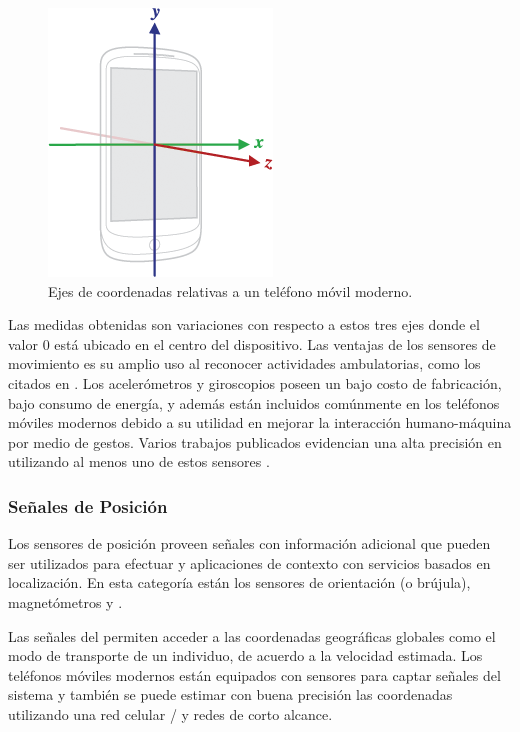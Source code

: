 \begin{figure}[!tbph]
\begin{centering}
\includegraphics[scale=0.7]{capitulo-4/graphics/axis_device}
\par\end{centering}
\caption[Sistemas de coordenadas relativo a dispositivo]{\label{fig4:axis-phone}Ejes de coordenadas relativas a un teléfono
móvil moderno.}

\end{figure}

Las medidas obtenidas son variaciones con respecto a estos tres ejes
donde el valor $0$ está ubicado en el centro del dispositivo. Las
ventajas de los sensores de movimiento es su amplio uso al reconocer
actividades ambulatorias, como los citados en \cite{Bao2004,Kwapisz2011,ReyesOrtiz2015}.
Los acelerómetros y giroscopios poseen un bajo costo de fabricación,
bajo consumo de energía, y además están incluidos comúnmente en los
teléfonos móviles modernos \cite{Google2016s} debido a su utilidad
en mejorar la interacción humano-máquina por medio de gestos. Varios
trabajos publicados evidencian una alta precisión en  utilizando
al menos uno de estos sensores \cite{Bao2004,LaraLabrador2012}.

\subsubsection{Señales de Posición}

Los sensores de posición proveen señales con información adicional
que pueden ser utilizados para efectuar  y aplicaciones
de contexto con servicios basados en localización. En esta categoría
están los sensores de orientación (o brújula), magnetómetros y 
\cite{Google2016s}.

Las señales del  permiten acceder a las coordenadas geográficas
globales como el modo de transporte de un individuo, de acuerdo a
la velocidad estimada. Los teléfonos móviles modernos están equipados
con sensores para captar señales del sistema  y también
se puede estimar con buena precisión las coordenadas utilizando una
red celular / y redes  de corto
alcance. 

